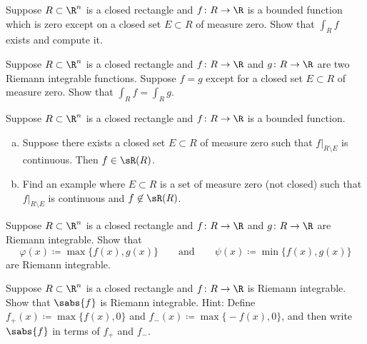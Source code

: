 \begin{exercise}
Suppose $R \subset \R^n$ is a closed rectangle and
$f \colon R \to \R$ is a bounded function which is zero except on a closed set $E
\subset R$ of measure
zero.  Show that $\int_R f$ exists and compute it.
\end{exercise}

\begin{exercise}
Suppose $R \subset \R^n$ is a closed rectangle and
$f \colon R \to \R$ and
$g \colon R \to \R$ are two Riemann integrable functions.  Suppose $f = g$
except for a closed set $E \subset R$ of measure zero.  Show that $\int_R f = \int_R g$.
\end{exercise}

\begin{samepage}
\begin{exercise}
Suppose $R \subset \R^n$ is a closed rectangle and
$f \colon R \to \R$ is a bounded function.
\begin{enumerate}[a)]
\item
Suppose there exists a closed set $E \subset R$ of measure zero such that
$f|_{R\setminus E}$ is continuous.  Then $f \in \sR(R)$.
\item
Find an example where $E \subset R$ is a set of measure zero
(not closed) such that
$f|_{R\setminus E}$ is continuous and $f \not\in \sR(R)$.
\end{enumerate}
\end{exercise}
\end{samepage}

\begin{exercise}
Suppose $R \subset \R^n$ is a closed rectangle
and $f \colon R \to \R$ and $g \colon R \to \R$ 
are Riemann integrable.
Show that
\begin{equation*}
\varphi(x) \coloneqq \max \bigl\{ f(x) , g(x) \bigr\}
\qquad
\text{and}
\qquad
\psi(x) \coloneqq \min \bigl\{ f(x) , g(x) \bigr\}
\end{equation*}
are Riemann integrable.
\end{exercise}

\begin{exercise}
Suppose $R \subset \R^n$ is a closed rectangle
and $f \colon R \to \R$ is Riemann integrable.
Show that $\sabs{f}$ is Riemann integrable.
Hint: Define
$f_+(x) \coloneqq \max \bigl\{ f(x) , 0 \bigr\}$ and
$f_-(x) \coloneqq \max \bigl\{ -f(x) , 0 \bigr\}$, and then write $\sabs{f}$
in terms of $f_+$ and $f_-$.
\end{exercise}

